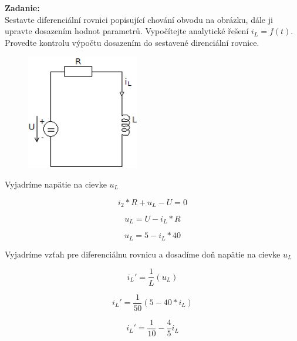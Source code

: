 \documentclass[a4paper,12pt]{article}
\begin{document}
\begin{flushleft}
\textbf{Zadanie:}\\
Sestavte diferenciální rovnici popisující chování obvodu na obrázku, dále ji upravte
dosazením hodnot parametrů. Vypočítejte analytické řešení $i_L = f(t)$. Provedte kontrolu 
výpočtu dosazením do sestavené direnciální rovnice.		
\end{flushleft}
\bigskip

\begin{figure}[!h]
  \centering
  \includegraphics[height=5cm]{obrazky/pr5}
\end{figure}

\begin{flushleft}
Vyjadríme napätie na cievke $u_L$
\end{flushleft}

\begin{equation*}
   i_2*R +u_L-U=0
\end{equation*}

\begin{equation*}
   u_L = U -i_L*R
\end{equation*}

\begin{equation*}
   u_L=5-i_L*40
\end{equation*}

\begin{flushleft}
Vyjadríme vzťah pre diferenciálnu rovnicu a dosadíme doň napätie na cievke $u_L$
\end{flushleft}

\begin{equation*}
  i_L\prime =\frac{1}{L}(u_L)
\end{equation*}

\begin{equation*}
  i_L\prime =\frac{1}{50}(5-40*i_L)
\end{equation*}

\begin{equation*}
  i_L\prime =\frac{1}{10}-\frac{4}{5}i_L
\end{equation*}
\end{document}
